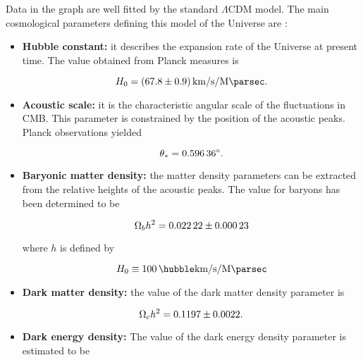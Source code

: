 Data in the graph are well fitted by the standard
$\Lambda$CDM model. The main cosmological parameters defining this model of
the Universe are \autocite{ade2016planck}:

\begin{itemize}
        \item \textbf{Hubble constant:} it describes the expansion rate of
        the Universe at present time. The value obtained from Planck
        measures is

        \begin{equation}
                H_0 = \SI{67.8 \pm 0.9}{\kilo\meter\per\second\per\mega\parsec}.
        \end{equation}

        \item \textbf{Acoustic scale:} it is the characteristic angular
        scale of the fluctuations in CMB. This parameter is constrained by
        the position of the acoustic peaks. Planck observations yielded

        \begin{equation}
                \theta_* = \ang{0.59636 \pm 0.00025}.
        \end{equation}

        \item \textbf{Baryonic matter density:} the matter density
        parameters can be extracted from the relative heights of the
        acoustic peaks. The value for baryons has been determined to be

        \begin{equation}
                \Omega_b h^2 = \num{0.02222 \pm 0.00023}
        \end{equation}

        where $h$ is defined by

        \begin{equation}
                H_0 \equiv \SI{100}{\hubble\kilo\meter\per\second\per\mega\parsec}
        \end{equation}

        \item \textbf{Dark matter density:} the value of the dark matter
        density parameter is

        \begin{equation}
                \Omega_c h^2 = \num{0.1197 \pm 0.0022}.
        \end{equation}

        \item \textbf{Dark energy density:} The value of the dark energy
        density parameter is estimated to be


\end{itemize}

